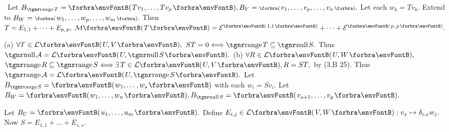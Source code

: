 \BulletPointX\Tips \,\,\,Let $B_{\range T}=\Par{Tv_1,\dots,Tv_p},B_V=\BigPar{v_1,\dots,v_p,\dots,v_n}.$ Let each $w_k=Tv_k.$\TextB{\vspace{2pt}}\IndentTips{}
Extend to $B_W=\BigPar{w_1,\dots,w_p,\dots,w_m}.$ Then $T=E_{1,1}+\dots+E_{p,\,p},\;\Mt{T}=\mEnt{1,1}+\dots+\mEnt{p,\,p}.$
\SepLine\pagebreak

(a) $\forall T\in\Lm{U,V},$ $ST=0\Longleftrightarrow\range T\subseteq\null S.$ Thus $\null\mA=\Lm{U,\null S}.$\parSol{\vspace{2pt}}
(b) $\forall R\in\Lm{U,W},$ $\range R\subseteq\range S \Longleftrightarrow\exists\,T\in\Lm{U,V},R=ST,$ by (3.B 25).\parSol{\Hb}
Thus $\range\mA=\Lm{U,\range S}.$\PfEnd\vspace{4pt}\quad
\Or Let $B_{\range S}=\Par{w_1,\dots,w_s}$ with each $w_i=Sv_i.$ Let $B_W=\Par{w_1,\dots,w_n},B_{\null S}=\Par{v_{s+1},\dots,v_p}.$\par\vspace{0pt}\quad
Let $B_U=\Par{u_1,\dots,u_m}.$ Define $E_{i,j}\in\Lm{V,W}:v_x\mapsto\delta_{i,x}w_j.$ Now $S=E_{1,1}+\dots+E_{s,s}.$\par\vspace{0pt}\quad%

